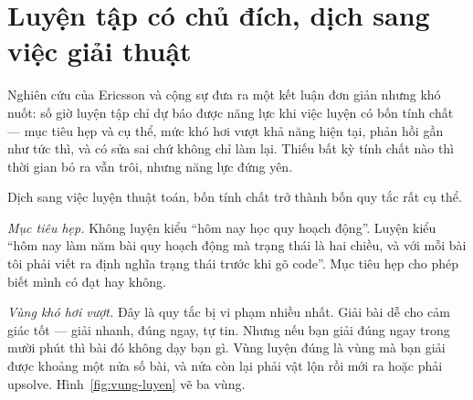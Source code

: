 \documentclass[../../algorithm.tex]{subfiles}
\begin{document}
\section{Luyện tập có chủ đích, dịch sang việc giải thuật}

Nghiên cứu của Ericsson và cộng sự\cite{ericsson1993} đưa ra một kết luận đơn giản nhưng khó nuốt: số giờ luyện tập chỉ dự báo được năng lực khi việc luyện có bốn tính chất --- mục tiêu hẹp và cụ thể, mức khó hơi vượt khả năng hiện tại, phản hồi gần như tức thì, và có sửa sai chứ không chỉ làm lại. Thiếu bất kỳ tính chất nào thì thời gian bỏ ra vẫn trôi, nhưng năng lực đứng yên.

Dịch sang việc luyện thuật toán, bốn tính chất trở thành bốn quy tắc rất cụ thể.

\emph{Mục tiêu hẹp.} Không luyện kiểu ``hôm nay học quy hoạch động''. Luyện kiểu ``hôm nay làm năm bài quy hoạch động mà trạng thái là hai chiều, và với mỗi bài tôi phải viết ra định nghĩa trạng thái trước khi gõ code''. Mục tiêu hẹp cho phép biết mình có đạt hay không.

\emph{Vùng khó hơi vượt.} Đây là quy tắc bị vi phạm nhiều nhất. Giải bài dễ cho cảm giác tốt --- giải nhanh, đúng ngay, tự tin. Nhưng nếu bạn giải đúng ngay trong mười phút thì bài đó không dạy bạn gì. Vùng luyện đúng là vùng mà bạn giải được khoảng một nửa số bài, và nửa còn lại phải vật lộn rồi mới ra hoặc phải upsolve. Hình~\ref{fig:vung-luyen} vẽ ba vùng.
\end{document}
